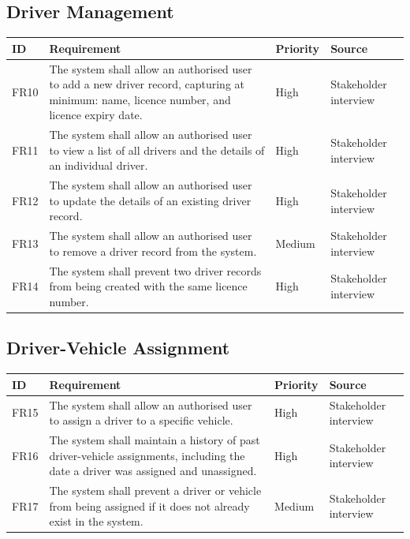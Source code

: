 \documentclass[11pt,a4paper]{article}
\begin{document}
\subsection{Driver Management}
\begin{longtable}{@{}p{1.3cm}p{9.2cm}p{1.6cm}p{2.4cm}@{}}
\toprule
ID & Requirement & Priority & Source \\
\midrule
\endhead
FR10 & The system shall allow an authorised user to add a new driver
record, capturing at minimum: name, licence number, and licence expiry
date. & High & Stakeholder interview \\
FR11 & The system shall allow an authorised user to view a list of all
drivers and the details of an individual driver. & High & Stakeholder
interview \\
FR12 & The system shall allow an authorised user to update the details of
an existing driver record. & High & Stakeholder interview \\
FR13 & The system shall allow an authorised user to remove a driver
record from the system. & Medium & Stakeholder interview \\
FR14 & The system shall prevent two driver records from being created
with the same licence number. & High & Stakeholder interview \\
\bottomrule
\end{longtable}

\subsection{Driver-Vehicle Assignment}
\begin{longtable}{@{}p{1.3cm}p{9.2cm}p{1.6cm}p{2.4cm}@{}}
\toprule
ID & Requirement & Priority & Source \\
\midrule
\endhead
FR15 & The system shall allow an authorised user to assign a driver to a
specific vehicle. & High & Stakeholder interview \\
FR16 & The system shall maintain a history of past driver-vehicle
assignments, including the date a driver was assigned and unassigned. &
High & Stakeholder interview \\
FR17 & The system shall prevent a driver or vehicle from being assigned
if it does not already exist in the system. & Medium & Stakeholder
interview \\
\bottomrule
\end{longtable}
\end{document}
